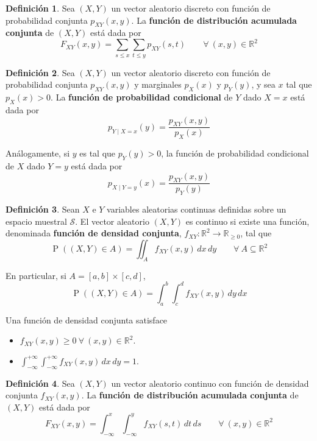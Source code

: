 \documentclass[11pt]{article}
\theoremstyle{plain}
\theoremstyle{definition}
\newtheorem*{defi}{Definición}
\theoremstyle{remark}
\newcommand{\deft}[1]{\textbf{#1}}  %
\newcommand{\proba}{\ensuremath{\operatorname{P}}}  %
\newcommand{\espm}[0]{\ensuremath{\mathcal{S}}}  %
\newcommand{\foralle}{\ensuremath{\forall \ }}  %
\begin{document}
    \begin{defi}
      Sea $(X,Y)$ un vector aleatorio discreto con función de probabilidad conjunta $p_{XY}(x,y)$. La \deft{función de distribución acumulada conjunta} de $(X,Y)$ está dada por
      \[ F_{XY}(x,y) = \sum_{s \leq x} \sum_{t \leq y} p_{XY}(s, t) \qquad \foralle (x,y) \in \mathbb{R}^2 \]
    \end{defi}

    \begin{defi}
      Sea $(X,Y)$ un vector aleatorio discreto con función de probabilidad conjunta $p_{XY}(x,y)$ y marginales $p_X(x)$ y $p_Y(y)$, y sea $x$ tal que $p_X(x) > 0$. La \deft{función de probabilidad condicional} de $Y$ dado $X = x$ está dada por
      \[ p_{Y \mid X = x}(y) = \frac{p_{XY}(x,y)}{p_X(x)} \]

      Análogamente, si $y$ es tal que $p_Y(y) > 0$, la función de probabilidad condicional de $X$ dado $Y = y$ está dada por
      \[ p_{X \mid Y = y}(x) = \frac{p_{XY}(x,y)}{p_Y(y)} \]
    \end{defi}

    \begin{defi}
      Sean $X$ e $Y$ variables aleatorias continuas definidas sobre un espacio muestral $\espm$. El vector aleatorio $(X,Y)$ es continuo si existe una función, denominada \deft{función de densidad conjunta}, $f_{XY} : \mathbb{R}^2 \to \mathbb{R}_{\geq 0}$, tal que
      \[ \proba((X,Y) \in A) = \iint_A f_{XY}(x,y) \,dx \,dy \qquad \foralle A \subseteq \mathbb{R}^2 \]
    \end{defi}

    En particular, si $A = [a,b] \times [c,d]$,
    \[ \proba((X,Y) \in A) = \int_a^b \int_c^d f_{XY}(x,y) \,dy \,dx \]

    Una función de densidad conjunta satisface
    \begin{itemize}
      \item $f_{XY}(x,y) \geq 0 \ \foralle (x,y) \in \mathbb{R}^2$.
      \item $\int_{-\infty}^{+\infty} \int_{-\infty}^{+\infty} f_{XY}(x,y) \,dx \,dy = 1$.
    \end{itemize}

    \begin{defi}
      Sea $(X,Y)$ un vector aleatorio continuo con función de densidad conjunta $f_{XY}(x,y)$. La \deft{función de distribución acumulada conjunta} de $(X,Y)$ está dada por
      \[ F_{XY} (x,y) = \int_{-\infty}^x \int_{-\infty}^y f_{XY}(s,t) \,dt \,ds \qquad \foralle (x,y) \in \mathbb{R}^2 \]
    \end{defi}
\end{document}
